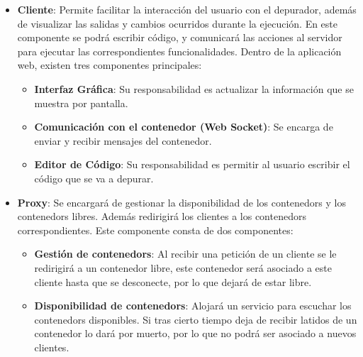 \begin{itemize}
    \item \textbf{Cliente}: Permite facilitar la interacción del usuario con el depurador, además de visualizar las salidas y cambios ocurridos durante la ejecución. En este componente se podrá escribir código, y comunicará las acciones al servidor para ejecutar las correspondientes funcionalidades. 
    Dentro de la aplicación web, existen tres componentes principales:

    \begin{itemize}
        \item \textbf{Interfaz Gráfica}: Su responsabilidad es actualizar la información que se muestra por pantalla.
        \item \textbf{Comunicación con el contenedor (Web Socket)}: Se encarga de enviar y recibir mensajes del contenedor.
        \item \textbf{Editor de Código}: Su responsabilidad es permitir al usuario escribir el código que se va a depurar.
    \end{itemize}

    \item \textbf{Proxy}: Se encargará de gestionar la disponibilidad de los \glspl{contenedor} y los \glspl{contenedor} libres. Además redirigirá los clientes a los \glspl{contenedor} correspondientes.
    Este componente consta de dos componentes:
    \begin{itemize}
        \item \textbf{Gestión de \glspl{contenedor}}: Al recibir una petición de un cliente se le redirigirá a un contenedor libre, este contenedor será asociado a este cliente hasta que se desconecte, por lo que dejará de estar libre.
        \item \textbf{Disponibilidad de \glspl{contenedor}}: Alojará un servicio para escuchar los \glspl{contenedor} disponibles. Si tras cierto tiempo deja de recibir latidos de un contenedor lo dará por muerto, por lo que no podrá ser asociado a nuevos clientes.  
    \end{itemize}


\end{itemize}
